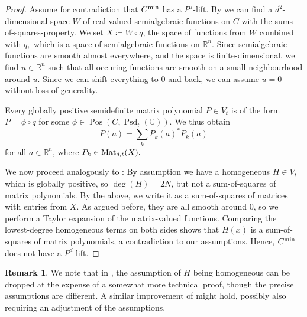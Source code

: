 \documentclass[11pt,onecolumn]{article}
\theoremstyle{plain}
\theoremstyle{definition}
\newtheorem{remark}[theorem]{Remark}
\newcommand{\C}{\mathbb{C}}
\newcommand{\R}{\mathbb{R}}
\begin{document}
\begin{proof} 
	Assume for contradiction that \(C^\textnormal{min}\) has a $P^d$-lift. By  we can find a $d^2$-dimensional space $W$ of real-valued semialgebraic functions on $C$ with the sums-of-squares-property.  We set \(X \coloneqq W\circ q\), the space of functions from $W$ combined with $q,$ which is a space of semialgebraic functions on $\R^n.$ Since semialgebraic functions are smooth almost everywhere, and the space is finite-dimensional, we find \(u \in \R^n\) such that all occuring functions are smooth on a small neighbourhood around \(u\). Since we can shift everything to $0$ and back, we can assume  \(u=0\) without loss of generality.  	  
  
	Every globally positive semidefinite matrix polynomial \(P \in V_t\) is  of the form \(P = \phi \circ q\) for some \(\phi \in \operatorname{Pos}(C, \operatorname{Psd}_t(\C))\). We thus obtain  \[P(a) = \sum_k P_k(a)^* P_k(a)\] for all $a\in\R^n$, where $P_k\in{\rm Mat}_{d,t}(X).$
 
	We now proceed analogously to \cite{faw}: By assumption we have a homogeneous \(H \in V_t\) which is globally positive, so \(\deg(H) = 2N\), but not a sum-of-squares of matrix polynomials. By the above, we write it as a sum-of-squares of matrices with entries from \(X\). As argued before, they are all smooth around 0, so we perform a Taylor expansion of the matrix-valued functions. Comparing the lowest-degree homogeneous terms on both sides shows that \(H(x)\) is a sum-of-squares of matrix polynomials, a contradiction to our assumptions. Hence, \(C^{\rm min}\) does not have a \(P^d\)-lift.
\end{proof}

\begin{remark}
    We note that in \cite{faw}, the assumption of \(H\) being homogeneous can be dropped at the expense of a somewhat more technical proof, though the precise assumptions are different. A similar improvement of  might hold, possibly also requiring an adjustment of the assumptions.
\end{remark}

\newpage\thispagestyle{empty}
{\linespread{1} }
\end{document}
